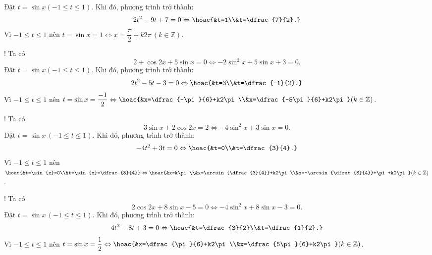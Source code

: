 \begin{bt}
{\begin{listEX}[2]
$$			$$
			Đặt $t=\sin{x}(-1\le t\le 1)$. Khi đó, phương trình trở thành:
			$$
			2t^2-9t+7=0 \Leftrightarrow \hoac{&t=1\\&t=\dfrac{7}{2}.}
			$$
			Vì $-1\le t\le 1$ nên $t=\sin{x}=1\Leftrightarrow x=\dfrac{\pi}{2}+k2\pi\,(k\in\mathbb{Z})$.
			\item! Ta có
			$$
			2+\cos{2x}+5\sin{x}=0 \Leftrightarrow -2\sin^2{x}+5\sin{x}+3=0.
			$$
			Đặt $t=\sin{x}(-1\le t\le 1)$. Khi đó, phương trình trở thành:
			$$
			2t^2-5t-3=0 \Leftrightarrow \hoac{&t=3\\&t=\dfrac{-1}{2}.}
			$$
			Vì $-1\le t\le 1$ nên $t=\sin{x}=\dfrac{-1}{2}\Leftrightarrow\hoac{&x=\dfrac{-\pi}{6}+k2\pi\\&x=\dfrac{-5\pi}{6}+k2\pi}(k\in\mathbb{Z})$.
			\item! Ta có
			$$
			3\sin{x}+2\cos{2x}=2 \Leftrightarrow -4\sin^2{x}+3\sin{x}=0.
			$$
			Đặt $t=\sin{x}\,(-1\le t\le 1)$. Khi đó, phương trình trở thành:
			$$
			-4t^2+3t=0 \Leftrightarrow \hoac{&t=0\\&t=\dfrac{3}{4}.}
			$$
			Vì $-1\le t\le 1$ nên $\hoac{&t=\sin{x}=0\\&t=\sin{x}=\dfrac{3}{4}}\Leftrightarrow \hoac{&x=k\pi\\&x=\arcsin{\dfrac{3}{4}}+k2\pi\\&x=-\arcsin{\dfrac{3}{4}}+\pi+k2\pi}(k\in\mathbb{Z})$.
			\item! Ta có
			$$
			2\cos{2x}+8\sin{x}-5=0 \Leftrightarrow -4\sin^2{x}+8\sin{x}-3=0.
			$$
			Đặt $t=\sin{x}\,(-1\le t\le 1)$. Khi đó, phương trình trở thành:
			$$
			4t^2-8t+3=0 \Leftrightarrow \hoac{&t=\dfrac{3}{2}\\&t=\dfrac{1}{2}.}
			$$
			Vì $-1\le t\le 1$ nên $t=\sin{x}=\dfrac{1}{2}\Leftrightarrow\hoac{&x=\dfrac{\pi}{6}+k2\pi\\&x=\dfrac{5\pi}{6}+k2\pi}(k\in\mathbb{Z})$.
		\end{listEX}
	}
\end{bt}


